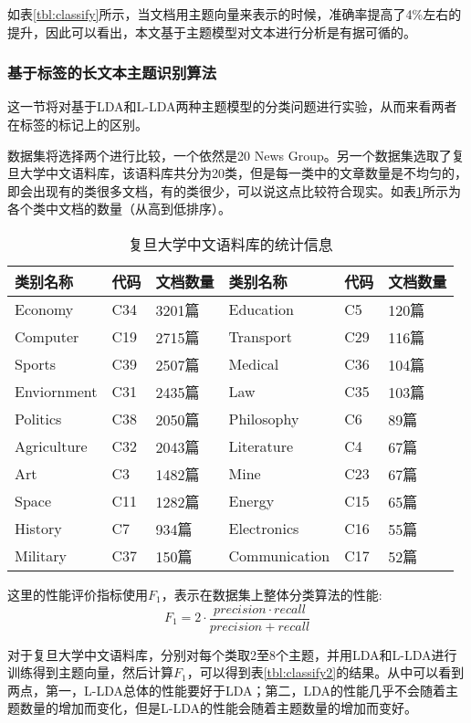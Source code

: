 如表\ref{tbl:classify}所示，当文档用主题向量来表示的时候，准确率提高了4\%左右的提升，因此可以看出，本文基于主题模型对文本进行分析是有据可循的。

\subsubsection{基于标签的长文本主题识别算法}
这一节将对基于LDA和L-LDA两种主题模型的分类问题进行实验，从而来看两者在标签的标记上的区别。

数据集将选择两个进行比较，一个依然是20 News Group。另一个数据集选取了复旦大学中文语料库，该语料库共分为20类，但是每一类中的文章数量是不均匀的，即会出现有的类很多文档，有的类很少，可以说这点比较符合现实。如表\ref{tbl:fudan}所示为各个类中文档的数量（从高到低排序）。
\begin{table}[!hbt]
  \centering
  \caption{复旦大学中文语料库的统计信息}
  \begin{tabular}{|lll|lll|}
    \hline
    类别名称 & 代码 & 文档数量 & 类别名称 & 代码 & 文档数量 \\
    \hline
    Economy & C34 & 3201篇 & Education & C5 & 120篇 \\
    Computer & C19 & 2715篇 & Transport & C29 & 116篇 \\
    Sports & C39 & 2507篇 & Medical & C36 & 104篇 \\
    Enviornment & C31 & 2435篇 & Law & C35 & 103篇 \\
    Politics & C38 & 2050篇 & Philosophy & C6 & 89篇 \\
    Agriculture & C32 & 2043篇 & Literature & C4 & 67篇 \\
    Art & C3 & 1482篇 & Mine & C23 & 67篇 \\
    Space & C11 & 1282篇 & Energy & C15 & 65篇 \\
    History & C7 & 934篇 & Electronics & C16 & 55篇 \\
    Military & C37 & 150篇 & Communication & C17 & 52篇 \\
    \hline
  \end{tabular}
  \label{tbl:fudan}
\end{table}

这里的性能评价指标使用$F_1$，表示在数据集上整体分类算法的性能:
\begin{equation}
  F_1=2\cdot \frac{precision\cdot recall}{precision+recall}
\end{equation}

对于复旦大学中文语料库，分别对每个类取2至8个主题，并用LDA和L-LDA进行训练得到主题向量，然后计算$F_1$，可以得到表\ref{tbl:classify2}的结果。从中可以看到两点，第一，L-LDA总体的性能要好于LDA；第二，LDA的性能几乎不会随着主题数量的增加而变化，但是L-LDA的性能会随着主题数量的增加而变好。

